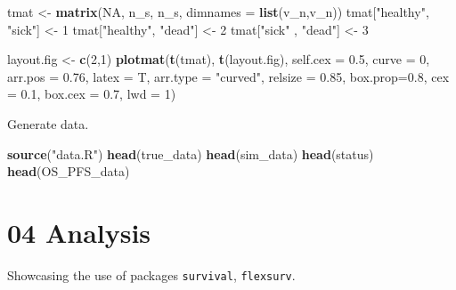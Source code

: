 \documentclass[
]{article}
\newenvironment{Shaded}{\begin{snugshade}}{\end{snugshade}}
\newcommand{\DataTypeTok}[1]{\textcolor[rgb]{0.13,0.29,0.53}{#1}}
\newcommand{\DecValTok}[1]{\textcolor[rgb]{0.00,0.00,0.81}{#1}}
\newcommand{\FloatTok}[1]{\textcolor[rgb]{0.00,0.00,0.81}{#1}}
\newcommand{\KeywordTok}[1]{\textcolor[rgb]{0.13,0.29,0.53}{\textbf{#1}}}
\newcommand{\NormalTok}[1]{#1}
\newcommand{\OtherTok}[1]{\textcolor[rgb]{0.56,0.35,0.01}{#1}}
\newcommand{\StringTok}[1]{\textcolor[rgb]{0.31,0.60,0.02}{#1}}
\begin{document}
\begin{Shaded}
\begin{Highlighting}[]
\NormalTok{tmat <-}\StringTok{ }\KeywordTok{matrix}\NormalTok{(}\OtherTok{NA}\NormalTok{, n_s, n_s, }\DataTypeTok{dimnames =} \KeywordTok{list}\NormalTok{(v_n,v_n))}
\NormalTok{tmat[}\StringTok{"healthy"}\NormalTok{, }\StringTok{"sick"}\NormalTok{]  <-}\StringTok{ }\DecValTok{1}
\NormalTok{tmat[}\StringTok{"healthy"}\NormalTok{, }\StringTok{"dead"}\NormalTok{]  <-}\StringTok{ }\DecValTok{2}
\NormalTok{tmat[}\StringTok{"sick"}\NormalTok{   , }\StringTok{"dead"}\NormalTok{]  <-}\StringTok{ }\DecValTok{3}

\NormalTok{layout.fig <-}\StringTok{ }\KeywordTok{c}\NormalTok{(}\DecValTok{2}\NormalTok{,}\DecValTok{1}\NormalTok{)}
\KeywordTok{plotmat}\NormalTok{(}\KeywordTok{t}\NormalTok{(tmat), }\KeywordTok{t}\NormalTok{(layout.fig), }\DataTypeTok{self.cex =} \FloatTok{0.5}\NormalTok{, }\DataTypeTok{curve =} \DecValTok{0}\NormalTok{, }\DataTypeTok{arr.pos =} \FloatTok{0.76}\NormalTok{,  }
        \DataTypeTok{latex =}\NormalTok{ T, }\DataTypeTok{arr.type =} \StringTok{"curved"}\NormalTok{, }\DataTypeTok{relsize =} \FloatTok{0.85}\NormalTok{, }\DataTypeTok{box.prop=}\FloatTok{0.8}\NormalTok{, }
        \DataTypeTok{cex =} \FloatTok{0.1}\NormalTok{, }\DataTypeTok{box.cex =} \FloatTok{0.7}\NormalTok{, }\DataTypeTok{lwd =} \DecValTok{1}\NormalTok{)}
\end{Highlighting}
\end{Shaded}

Generate data.

\begin{Shaded}
\begin{Highlighting}[]
\KeywordTok{source}\NormalTok{(}\StringTok{"data.R"}\NormalTok{)}
\KeywordTok{head}\NormalTok{(true_data)}
\KeywordTok{head}\NormalTok{(sim_data)}
\KeywordTok{head}\NormalTok{(status)}
\KeywordTok{head}\NormalTok{(OS_PFS_data)}
\end{Highlighting}
\end{Shaded}

\hypertarget{analysis}{%
\section{04 Analysis}\label{analysis}}

Showcasing the use of packages \texttt{survival}, \texttt{flexsurv}.
\end{document}
